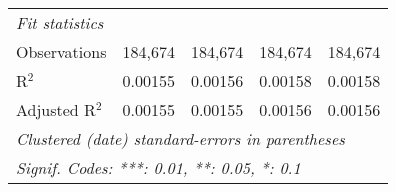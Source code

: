 \begin{table}[H]
\begin{tabular}{lcccc}
      \emph{Fit statistics}\\
      Observations   & 184,674        & 184,674       & 184,674       & 184,674\\  
      R$^2$          & 0.00155        & 0.00156       & 0.00158       & 0.00158\\  
      Adjusted R$^2$ & 0.00155        & 0.00155       & 0.00156       & 0.00156\\  
      \midrule \midrule
      \multicolumn{5}{l}{\emph{Clustered (date) standard-errors in parentheses}}\\
      \multicolumn{5}{l}{\emph{Signif. Codes: ***: 0.01, **: 0.05, *: 0.1}}\\
   \end{tabular}
\end{table}
